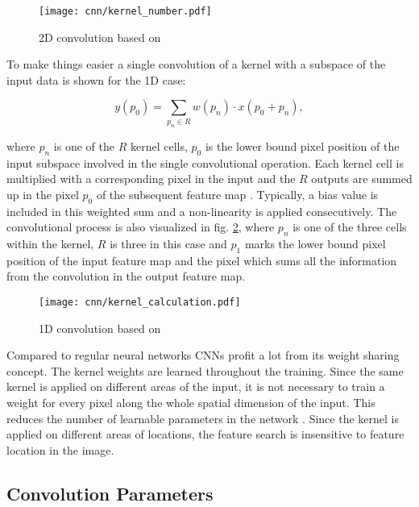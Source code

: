 \begin{figure}[H]
  \centering
  \texttt{[image: cnn/kernel\_number.pdf]}
  \caption {2D convolution based on \cite{Ganesh2019}}
  \label{fig:kernel_number}
\end{figure}

To make things easier a single convolution of a kernel with a subspace of the input data is shown for the 1D case:

\begin{equation}
  y(p_{0}) = \sum_{p_{n} \in R} w(p_{n}) \cdot x(p_{0} + p_{n}), 
  \label{eq:kernel}
\end{equation}

where $p_{n}$ is one of the $R$ kernel cells, $p_{0}$ is the lower bound pixel position of the input subspace involved in the single convolutional operation. Each kernel cell is multiplied with a corresponding pixel in the input and the $R$ outputs are summed up in the pixel $p_{0}$ of the subsequent feature map \cite{Ganesh2019}. Typically, a bias value is included in this weighted sum and a non-linearity is applied consecutively. The convolutional process is also visualized in fig. \ref{fig:kernel}, where $p_{n}$ is one of the three cells within the kernel, $R$ is three in this case and $p_{1}$ marks the lower bound pixel position of the input feature map and the pixel which sums all the information from the convolution in the output feature map.


\begin{figure}[H]
  \centering
  \texttt{[image: cnn/kernel\_calculation.pdf]}
  \caption {1D convolution based on \cite{Ganesh2019}}
  \label{fig:kernel}
\end{figure}

Compared to regular neural networks CNNs profit a lot from its weight sharing concept. The kernel weights are learned throughout the training. Since the same kernel is applied on different areas of the input, it is not necessary to train a weight for every pixel along the whole spatial dimension of the input. This reduces the number of learnable parameters in the network \cite{OShea2015}. Since the kernel is applied on different areas of locations, the feature search is insensitive to feature location in the image.

\subsection{Convolution Parameters}


